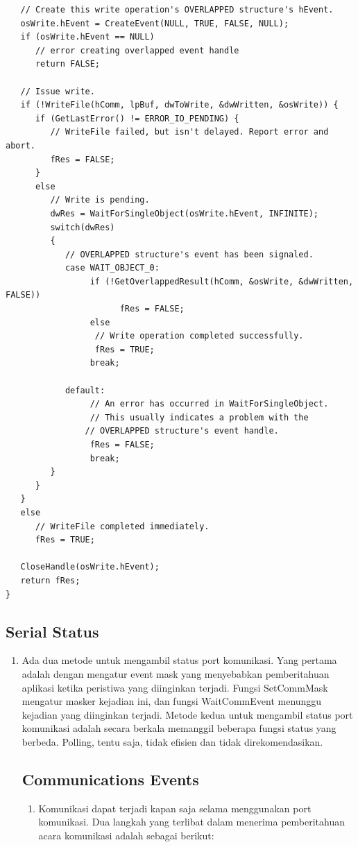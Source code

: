 \begin{enumerate}
\begin{verbatim}
   // Create this write operation's OVERLAPPED structure's hEvent.
   osWrite.hEvent = CreateEvent(NULL, TRUE, FALSE, NULL);
   if (osWrite.hEvent == NULL)
      // error creating overlapped event handle
      return FALSE;

   // Issue write.
   if (!WriteFile(hComm, lpBuf, dwToWrite, &dwWritten, &osWrite)) {
      if (GetLastError() != ERROR_IO_PENDING) { 
         // WriteFile failed, but isn't delayed. Report error and abort.
         fRes = FALSE;
      }
      else
         // Write is pending.
         dwRes = WaitForSingleObject(osWrite.hEvent, INFINITE);
         switch(dwRes)
         {
            // OVERLAPPED structure's event has been signaled. 
            case WAIT_OBJECT_0:
                 if (!GetOverlappedResult(hComm, &osWrite, &dwWritten, FALSE))
                       fRes = FALSE;
                 else
                  // Write operation completed successfully.
                  fRes = TRUE;
                 break;
            
            default:
                 // An error has occurred in WaitForSingleObject.
                 // This usually indicates a problem with the
                // OVERLAPPED structure's event handle.
                 fRes = FALSE;
                 break;
         }
      }
   }
   else
      // WriteFile completed immediately.
      fRes = TRUE;

   CloseHandle(osWrite.hEvent);
   return fRes;
}
\end{verbatim}	

	\subsection{Serial Status}
		\begin{enumerate}
			\item Ada dua metode untuk mengambil status port komunikasi. Yang pertama adalah dengan mengatur event mask yang menyebabkan pemberitahuan aplikasi ketika peristiwa yang diinginkan terjadi. Fungsi SetCommMask mengatur masker kejadian ini, dan fungsi WaitCommEvent menunggu kejadian yang diinginkan terjadi. Metode kedua untuk mengambil status port komunikasi adalah secara berkala memanggil beberapa fungsi status yang berbeda. Polling, tentu saja, tidak efisien dan tidak direkomendasikan.
			\subsection{Communications Events}
				\begin{enumerate}
				\item Komunikasi dapat terjadi kapan saja selama menggunakan port komunikasi. Dua langkah yang terlibat dalam menerima pemberitahuan acara komunikasi adalah sebagai berikut:


\end{enumerate}
\end{enumerate}
\end{enumerate}
